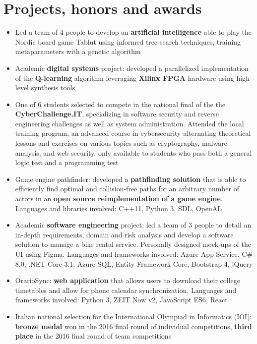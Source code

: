 \documentclass[10pt, a4paper]{extarticle}
\begin{document}
  \section*{Projects, honors and awards}
  \begin{itemize}
    \item Led a team of 4 people to develop an \textbf{artificial intelligence} able to play the Nordic board game Tablut using informed tree search techniques, training metaparameters with a genetic algorithm
    \item Academic \textbf{digital systems} project: developed a parallelized implementation of the \textbf{Q-learning} algorithm leveraging \textbf{Xilinx FPGA} hardware using high-level synthesis tools
    \item One of 6 students selected to compete in the national final of the the \textbf{CyberChallenge.IT}, specializing in software security and reverse engineering challenges as well as system administration.
      Attended the local training program, an advanced course in cybersecurity alternating theoretical lessons and exercises on various topics such as cryptography, malware analysis, and web security, only available to students who pass both a general logic test and a programming test
    \item Game engine pathfinder: developed a \textbf{pathfinding solution} that is able to efficiently find optimal and collision-free paths for an arbitrary number of actors in an \textbf{open source reimplementation of a game engine}. Languages and libraries involved: C++11, Python 3, SDL, OpenAL
    \item Academic \textbf{software engineering} project: led a team of 3 people to detail an in-depth requirements, domain and risk analysis and develop a software solution to manage a bike rental service. Personally designed mock-ups of the UI using Figma. Languages and frameworks involved: Azure App Service, C\# 8.0, .NET Core 3.1, Azure SQL, Entity Framework Core, Bootstrap 4, jQuery
    \item OrarioSync: \textbf{web application} that allows users to download their college timetables and allow for phone calendar synchronization. Languages and frameworks involved: Python 3, ZEIT Now v2, JavaScript ES6, React
    \item Italian national selection for the International Olympiad in Informatics (IOI): \textbf{bronze medal} won in the 2016 final round of individual competitions, \textbf{third place} in the 2016 final round of team competitions


  \end{itemize}
\end{document}

